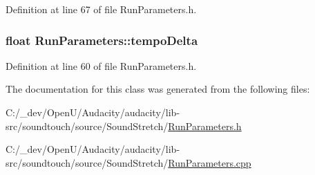 Definition at line 67 of file Run\+Parameters.\+h.

\subsubsection[{\texorpdfstring{tempo\+Delta}{tempoDelta}}]{\setlength{\rightskip}{0pt plus 5cm}float Run\+Parameters\+::tempo\+Delta}\hypertarget{class_run_parameters_af94d2637beb78d3b5faa53ccb237320d}{}\label{class_run_parameters_af94d2637beb78d3b5faa53ccb237320d}


Definition at line 60 of file Run\+Parameters.\+h.



The documentation for this class was generated from the following files\+:\begin{DoxyCompactItemize}
\item 
C\+:/\+\_\+dev/\+Open\+U/\+Audacity/audacity/lib-\/src/soundtouch/source/\+Sound\+Stretch/\hyperlink{_run_parameters_8h}{Run\+Parameters.\+h}\item 
C\+:/\+\_\+dev/\+Open\+U/\+Audacity/audacity/lib-\/src/soundtouch/source/\+Sound\+Stretch/\hyperlink{_run_parameters_8cpp}{Run\+Parameters.\+cpp}\end{DoxyCompactItemize}

